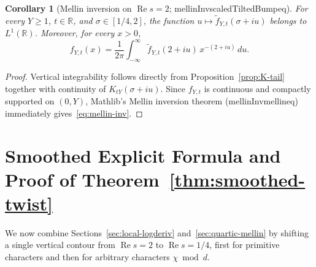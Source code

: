 \documentclass[11pt,reqno]{amsart}
\numberwithin{equation}{section}
\newtheorem{corollary}[theorem]{Corollary}
\theoremstyle{definition}
\newcommand{\R}{\mathbb{R}}
\newcommand{\1}{\mathbf{1}}
\renewcommand{\Re}{\operatorname{Re}}
\newcommand{\lean}[1]{{\footnotesize\ttfamily\renewcommand{\_}{\textunderscore\allowbreak}#1}}
\begin{document}
\begin{corollary}[Mellin inversion on $\Re s = 2$; \lean{mellinInv\_scaledTiltedBump\_eq}]
\label{cor:mellin-inv}
For every $Y \ge 1$, $t \in \R$, and $\sigma \in [1/4, 2]$, the function $u \mapsto \widetilde{f}_{Y,t}(\sigma + iu)$ belongs to $L^1(\R)$. Moreover, for every $x > 0$,
\begin{equation}\label{eq:mellin-inv}
  f_{Y,t}(x) = \frac{1}{2\pi} \int_{-\infty}^\infty \widetilde{f}_{Y,t}(2 + iu)\, x^{-(2+iu)}\,du.
\end{equation}
\end{corollary}

\begin{proof}
Vertical integrability follows directly from Proposition~\ref{prop:K-tail} together with continuity of $K_{tY}(\sigma+iu)$. Since $f_{Y,t}$ is continuous and compactly supported on $(0, Y)$, Mathlib's Mellin inversion theorem (\lean{mellinInv\_mellin\_eq}) immediately gives~\eqref{eq:mellin-inv}.
\end{proof}

\section{Smoothed Explicit Formula and Proof of Theorem~\ref{thm:smoothed-twist}}
\label{sec:explicit-formula}

We now combine Sections~\ref{sec:local-logderiv} and~\ref{sec:quartic-mellin} by shifting a single vertical contour from $\Re s = 2$ to $\Re s = 1/4$, first for primitive characters and then for arbitrary characters $\chi \bmod d$.
\end{document}
